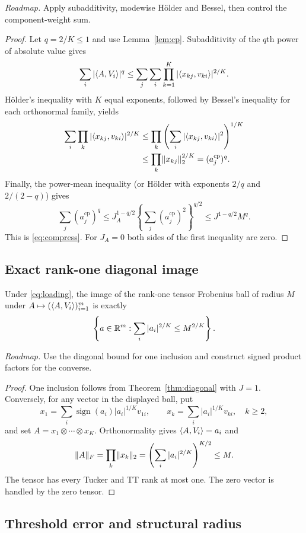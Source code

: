 \noindent\emph{Roadmap.} Apply subadditivity, modewise H\"older and Bessel, then control the component-weight sum.
\begin{proof}
Let $q=2/K\le1$ and use Lemma~\ref{lem:cp}. Subadditivity of the $q$th power of absolute value gives
\[
 \sum_i|\langle A,V_i\rangle|^q
 \le\sum_j\sum_i\prod_{k=1}^K|\langle x_{kj},v_{ki}\rangle|^{2/K}.
\]
H\"older's inequality with $K$ equal exponents, followed by Bessel's inequality for each orthonormal family, yields
\begin{align*}
 \sum_i\prod_k|\langle x_{kj},v_{ki}\rangle|^{2/K}
 &\le\prod_k\left(\sum_i|\langle x_{kj},v_{ki}\rangle|^2\right)^{1/K}\\
 &\le\prod_k\lVert x_{kj}\rVert_2^{2/K}=(a_j^{\mathrm{cp}})^q.
\end{align*}
Finally, the power-mean inequality (or H\"older with exponents $2/q$ and $2/(2-q)$) gives
\[
 \sum_j(a_j^{\mathrm{cp}})^q
 \le J_A^{1-q/2}\left\{\sum_j(a_j^{\mathrm{cp}})^2\right\}^{q/2}
 \le J^{1-q/2}M^q.
\]
This is \eqref{eq:compress}. For $J_A=0$ both sides of the first inequality are zero.
\end{proof}

\subsection{Exact rank-one diagonal image}

\begin{lemma}\label{lem:image}
Under \eqref{eq:loading}, the image of the rank-one tensor Frobenius ball of radius $M$ under $A\mapsto(\langle A,V_i\rangle)_{i=1}^m$ is exactly
\[
 \left\{a\in\mathbb R^m:\sum_i|a_i|^{2/K}\le M^{2/K}\right\}.
\]
\end{lemma}


\noindent\emph{Roadmap.} Use the diagonal bound for one inclusion and construct signed product factors for the converse.
\begin{proof}
One inclusion follows from Theorem~\ref{thm:diagonal} with $J=1$. Conversely, for any vector in the displayed ball, put
\[
 x_1=\sum_i\operatorname{sign}(a_i)|a_i|^{1/K}v_{1i},\qquad
 x_k=\sum_i|a_i|^{1/K}v_{ki},\quad k\ge2,
\]
and set $A=x_1\otimes\cdots\otimes x_K$. Orthonormality gives $\langle A,V_i\rangle=a_i$ and
\[
 \lVert A\rVert_F=\prod_k\lVert x_k\rVert_2
 =\left(\sum_i|a_i|^{2/K}\right)^{K/2}\le M.
\]
The tensor has every Tucker and TT rank at most one. The zero vector is handled by the zero tensor.
\end{proof}

\subsection{Threshold error and structural radius}

